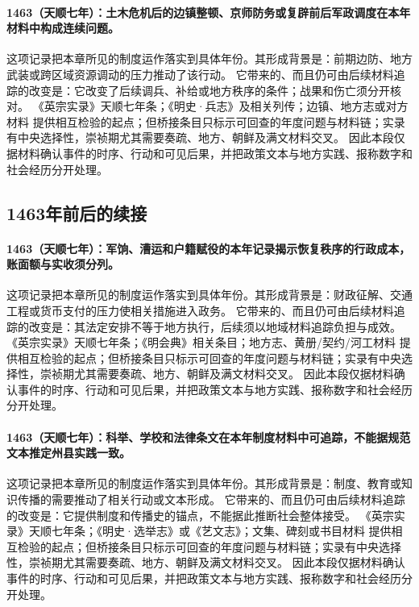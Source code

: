 \paragraph{1463（天顺七年）：土木危机后的边镇整顿、京师防务或复辟前后军政调度在本年材料中构成连续问题。} 这项记录把本章所见的制度运作落实到具体年份。其形成背景是：前期边防、地方武装或跨区域资源调动的压力推动了该行动。 它带来的、而且仍可由后续材料追踪的改变是：它改变了后续调兵、补给或地方秩序的条件；战果和伤亡须分开核对。 《英宗实录》天顺七年条；《明史·兵志》及相关列传；边镇、地方志或对方材料 提供相互检验的起点；但桥接条目只标示可回查的年度问题与材料链；实录有中央选择性，崇祯期尤其需要奏疏、地方、朝鲜及满文材料交叉。 因此本段仅据材料确认事件的时序、行动和可见后果，并把政策文本与地方实践、报称数字和社会经历分开处理。

\subsection{1463年前后的续接}

\paragraph{1463（天顺七年）：军饷、漕运和户籍赋役的本年记录揭示恢复秩序的行政成本，账面额与实收须分列。} 这项记录把本章所见的制度运作落实到具体年份。其形成背景是：财政征解、交通工程或货币支付的压力使相关措施进入政务。 它带来的、而且仍可由后续材料追踪的改变是：其法定安排不等于地方执行，后续须以地域材料追踪负担与成效。 《英宗实录》天顺七年条；《明会典》相关条目；地方志、黄册/契约/河工材料 提供相互检验的起点；但桥接条目只标示可回查的年度问题与材料链；实录有中央选择性，崇祯期尤其需要奏疏、地方、朝鲜及满文材料交叉。 因此本段仅据材料确认事件的时序、行动和可见后果，并把政策文本与地方实践、报称数字和社会经历分开处理。

\paragraph{1463（天顺七年）：科举、学校和法律条文在本年制度材料中可追踪，不能据规范文本推定州县实践一致。} 这项记录把本章所见的制度运作落实到具体年份。其形成背景是：制度、教育或知识传播的需要推动了相关行动或文本形成。 它带来的、而且仍可由后续材料追踪的改变是：它提供制度和传播史的锚点，不能据此推断社会整体接受。 《英宗实录》天顺七年条；《明史·选举志》或《艺文志》；文集、碑刻或书目材料 提供相互检验的起点；但桥接条目只标示可回查的年度问题与材料链；实录有中央选择性，崇祯期尤其需要奏疏、地方、朝鲜及满文材料交叉。 因此本段仅据材料确认事件的时序、行动和可见后果，并把政策文本与地方实践、报称数字和社会经历分开处理。

